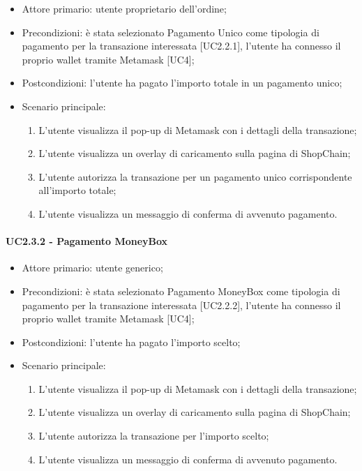 \begin{itemize}
    \item Attore primario: utente proprietario dell'ordine;
    \item Precondizioni: è stata selezionato Pagamento Unico come tipologia di pagamento per la transazione interessata [UC2.2.1], l'utente ha connesso il proprio wallet\glo{} tramite Metamask\glo{} [UC4];
    \item Postcondizioni: l'utente ha pagato l'importo totale in un pagamento unico;
    \item Scenario principale:
    \begin{enumerate}
        \item L'utente visualizza il pop-up di Metamask\glo{} con i dettagli della transazione;
        \item L'utente visualizza un overlay di caricamento sulla pagina di ShopChain;
        \item L'utente autorizza la transazione per un pagamento unico corrispondente all'importo totale;
        \item L'utente visualizza un messaggio di conferma di avvenuto pagamento.
    \end{enumerate}
\end{itemize}

\paragraph{UC2.3.2 - Pagamento MoneyBox}

\begin{itemize}
    \item Attore primario: utente generico;
    \item Precondizioni: è stata selezionato Pagamento MoneyBox\glo{} come tipologia di pagamento per la transazione interessata [UC2.2.2], l'utente ha connesso il proprio wallet\glo{} tramite Metamask\glo{} [UC4];
    \item Postcondizioni: l'utente ha pagato l'importo scelto;
    \item Scenario principale:
    \begin{enumerate}
        \item L'utente visualizza il pop-up di Metamask\glo{} con i dettagli della transazione;
        \item L'utente visualizza un overlay di caricamento sulla pagina di ShopChain;
        \item L'utente autorizza la transazione per l'importo scelto;
        \item L'utente visualizza un messaggio di conferma di avvenuto pagamento.
    \end{enumerate}
\end{itemize}

